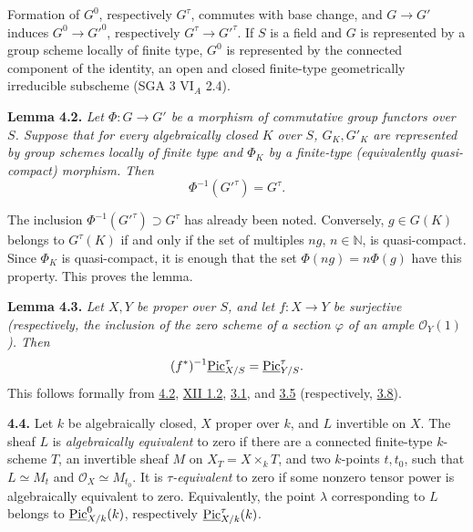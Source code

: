Formation of \(G^0\), respectively \(G^\tau\), commutes with base change,
and \(G\to G'\) induces \(G^0\to G'^0\), respectively
\(G^\tau\to G'^\tau\). If \(S\) is a field and \(G\) is represented by a
group scheme locally of finite type, \(G^0\) is represented by the
connected component of the identity, an open and closed finite-type
geometrically irreducible subscheme (SGA 3 VI\(_A\) 2.4).

\textbf{Lemma 4.2.} \emph{Let \(\Phi:G\to G'\) be a morphism of
commutative group functors over \(S\). Suppose that for every
algebraically closed \(K\) over \(S\), \(G_K,G'_K\) are represented by
group schemes locally of finite type and \(\Phi_K\) by a finite-type
(equivalently quasi-compact) morphism. Then}
\[
\Phi^{-1}(G'^\tau)=G^\tau.
\]

The inclusion \(\Phi^{-1}(G'^\tau)\supset G^\tau\) has already been
noted. Conversely, \(g\in G(K)\) belongs to \(G^\tau(K)\) if and only if
the set of multiples \(ng\), \(n\in\mathbb N\), is quasi-compact. Since
\(\Phi_K\) is quasi-compact, it is enough that the set
\(\Phi(ng)=n\Phi(g)\) have this property. This proves the lemma.

\textbf{Lemma 4.3.} \emph{Let \(X,Y\) be proper over \(S\), and let
\(f:X\to Y\) be surjective (respectively, the inclusion of the zero
scheme of a section \(\varphi\) of an ample \(\mathcal O_Y(1)\)). Then}
\[
(f^*)^{-1}\underline{\operatorname{Pic}}^\tau_{X/S}
=\underline{\operatorname{Pic}}^\tau_{Y/S}.
\]
This follows formally from \hyperlink{sga6.e13.lem.4-2}{4.2}, \hyperlink{sga6.e12.cor.1-2}{XII 1.2}, \hyperlink{sga6.e13.lem.3-1}{3.1}, and \hyperlink{sga6.e13.thm.3-5}{3.5} (respectively,
\hyperlink{sga6.e13.thm.3-8}{3.8}).

\textbf{4.4.} Let \(k\) be algebraically closed, \(X\) proper over \(k\),
and \(L\) invertible on \(X\). The sheaf \(L\) is \emph{algebraically
equivalent} to zero if there are a connected finite-type \(k\)-scheme
\(T\), an invertible sheaf \(M\) on \(X_T=X\times_kT\), and two
\(k\)-points \(t,t_0\), such that \(L\simeq M_t\) and
\(\mathcal O_X\simeq M_{t_0}\). It is \emph{\(\tau\)-equivalent} to zero
if some nonzero tensor power is algebraically equivalent to zero.
Equivalently, the point \(\lambda\) corresponding to \(L\) belongs to
\(\underline{\operatorname{Pic}}^0_{X/k}(k)\), respectively
\(\underline{\operatorname{Pic}}^\tau_{X/k}(k)\).

